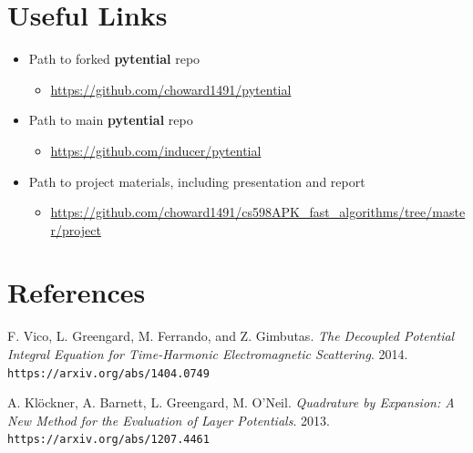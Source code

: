 \documentclass{article}[12pt]
\begin{document}
	\newpage
	\section{Useful Links}
	\begin{itemize}
		\item Path to forked \textbf{pytential} repo
		\begin{itemize}
			\item \href{https://github.com/choward1491/pytential}{https://github.com/choward1491/pytential}
		\end{itemize}
		\item Path to main \textbf{pytential} repo
		\begin{itemize}
			\item \href{https://github.com/inducer/pytential}{https://github.com/inducer/pytential}
		\end{itemize}
		\item Path to project materials, including presentation and report
		\begin{itemize}
			\item \href{https://github.com/choward1491/cs598APK_fast_algorithms/tree/master/project}{https://github.com/choward1491/cs598APK\_fast\_algorithms/tree/master/project}
		\end{itemize}
	\end{itemize}


	\newpage	
	\section{References}
	\begin{thebibliography}{9}
		F. Vico, L. Greengard, M. Ferrando, and Z. Gimbutas. 
		\textit{The Decoupled Potential Integral Equation for Time-Harmonic Electromagnetic Scattering}. 
		2014. \\\texttt{https://arxiv.org/abs/1404.0749}
		
		A. Klöckner, A. Barnett, L. Greengard, M. O'Neil.
		\textit{Quadrature by Expansion: A New Method for the Evaluation of Layer Potentials}.
		2013. \\\texttt{https://arxiv.org/abs/1207.4461}
		
	\end{thebibliography}
		
	
\end{document}
